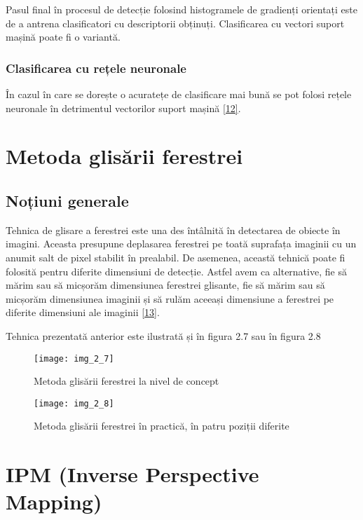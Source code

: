 Pasul final în procesul de detecție folosind histogramele de gradienți orientați este de a antrena clasificatori cu descriptorii obținuți. Clasificarea cu vectori suport mașină poate fi o variantă.

\subsubsection {Clasificarea cu rețele neuronale}

În cazul în care se dorește o acuratețe de clasificare mai bună se pot folosi rețele neuronale în detrimentul vectorilor suport mașină \hyperlink{NavneetDalalBillTriggs}{[12]}.

\section{Metoda glisării ferestrei}

\subsection{Noțiuni generale}

Tehnica de glisare a ferestrei este una des întâlnită în detectarea de obiecte în imagini. Aceasta presupune deplasarea ferestrei pe toată suprafața imaginii cu un anumit salt de pixel stabilit în prealabil. De asemenea, această tehnică poate fi folosită pentru diferite dimensiuni de detecție. Astfel avem ca alternative, fie să mărim sau să micșorăm dimensiunea ferestrei glisante, fie să mărim sau să micșorăm dimensiunea imaginii și să rulăm aceeași dimensiune a ferestrei pe diferite dimensiuni ale imaginii \hyperlink{RichardSzeliski}{[13]}.

Tehnica prezentată anterior este ilustrată și în figura 2.7 sau în figura 2.8
\begin{figure}[!h]
	\centering
	\texttt{[image: img\_2\_7]}
	\caption{Metoda glisării ferestrei la nivel de concept}
	\label{fig:nonfloat}
\end{figure}
\begin{figure}[!h]
	\centering
	\texttt{[image: img\_2\_8]}
	\caption{Metoda glisării ferestrei în practică, în patru poziții diferite}
	\label{fig:nonfloat}
\end{figure}

\section{IPM (Inverse Perspective Mapping)}

